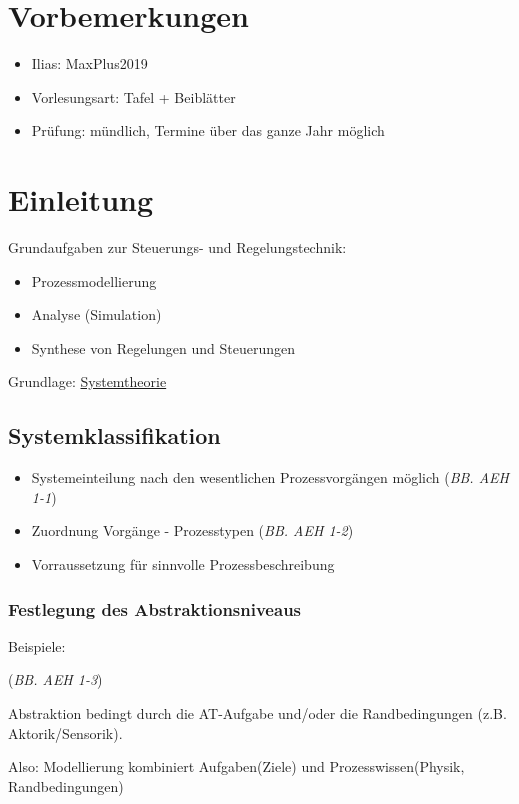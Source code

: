 
\section*{Vorbemerkungen}
\begin{itemize}
	\item Ilias: MaxPlus2019
	\item Vorlesungsart: Tafel + Beiblätter
	\item Prüfung: mündlich, Termine über das ganze Jahr möglich
\end{itemize}

\section{Einleitung}
Grundaufgaben zur Steuerungs- und Regelungstechnik:
\begin{itemize}
	\item Prozessmodellierung
	\item Analyse (Simulation)
	\item Synthese von Regelungen und Steuerungen 
\end{itemize}
Grundlage: \underline{Systemtheorie}

\subsection{Systemklassifikation}
\begin{itemize}
	\item Systemeinteilung nach den wesentlichen Prozessvorgängen möglich (\textit{BB. AEH 1-1})
	\item Zuordnung Vorgänge - Prozesstypen (\textit{BB. AEH 1-2})
	\item Vorraussetzung für sinnvolle Prozessbeschreibung
\end{itemize}

\subsubsection{Festlegung des Abstraktionsniveaus}
Beispiele:


(\textit{BB. AEH 1-3})

Abstraktion bedingt durch die AT-Aufgabe und/oder die Randbedingungen (z.B. Aktorik/Sensorik).

Also: Modellierung kombiniert Aufgaben(Ziele) und Prozesswissen(Physik, Randbedingungen)

